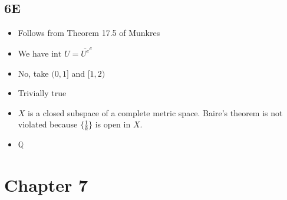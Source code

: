 \documentclass{article}
\begin{document}
\subsection*{6E}
\begin{itemize}
    \item [1] Follows from Theorem 17.5 of Munkres
    \item [2] We have $\text{int } U=\overline{U^c}^c$
    \item[3]  No, take $(0,1]$ and $[1,2)$
    \item[4] Trivially true 
    \item[5] $X$ is a closed subspace of a complete metric space. Baire's theorem is not violated because $\{\frac{1}{k}\}$ is open in $X$.
    \item[6] $\mathbb{Q}$
\end{itemize}

\section*{Chapter 7}
\end{document}
